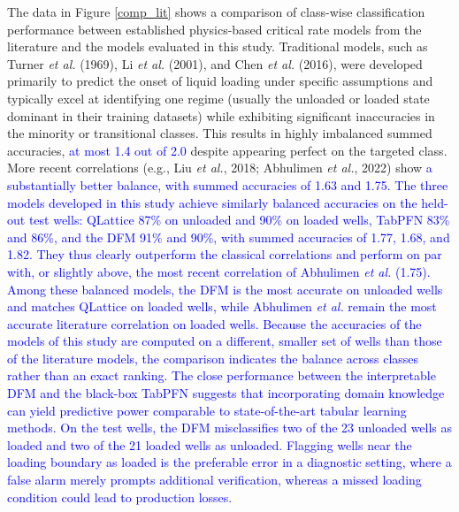 \documentclass[journal=jacsat,manuscript=article]{achemso}
\newcommand{\al}{\textcolor{blue}}
\theoremstyle{thmstyleone}%
\theoremstyle{thmstyletwo}%
\theoremstyle{thmstylethree}%
\begin{document}
 The data in Figure \ref{comp_lit} shows a comparison of class-wise classification performance between established physics-based critical rate models from the literature and the models evaluated in this study. Traditional models, such as Turner \textit{et al.} (1969)\cite{Turner1969}, Li \textit{et al.} (2001)\cite{Li2001}, and Chen \textit{et al.} (2016)\cite{Chen2016}, were developed primarily to predict the onset of liquid loading under specific assumptions and typically excel at identifying one regime (usually the unloaded or loaded state dominant in their training datasets) while exhibiting significant inaccuracies in the minority or transitional classes. This results in highly imbalanced summed accuracies, \al{at most 1.4 out of 2.0} despite appearing perfect on the targeted class. More recent correlations (e.g., Liu \textit{et al.}, 2018\cite{Liu2018}; Abhulimen \textit{et al.}, 2022\cite{Abhulimen}) show \al{a substantially better balance, with summed accuracies of 1.63 and 1.75.} \al{The three models developed in this study achieve similarly balanced accuracies on the held-out test wells: QLattice 87\% on unloaded and 90\% on loaded wells, TabPFN 83\% and 86\%, and the DFM 91\% and 90\%, with summed accuracies of 1.77, 1.68, and 1.82. They thus clearly outperform the classical correlations and perform on par with, or slightly above, the most recent correlation of Abhulimen \textit{et al.} (1.75). Among these balanced models, the DFM is the most accurate on unloaded wells and matches QLattice on loaded wells, while Abhulimen \textit{et al.} remain the most accurate literature correlation on loaded wells. Because the accuracies of the models of this study are computed on a different, smaller set of wells than those of the literature models, the comparison indicates the balance across classes rather than an exact ranking. The close performance between the interpretable DFM and the black-box TabPFN suggests that incorporating domain knowledge can yield predictive power comparable to state-of-the-art tabular learning methods. On the test wells, the DFM misclassifies two of the 23 unloaded wells as loaded and two of the 21 loaded wells as unloaded. Flagging wells near the loading boundary as loaded is the preferable error in a diagnostic setting, where a false alarm merely prompts additional verification, whereas a missed loading condition could lead to production losses.}
\end{document}
